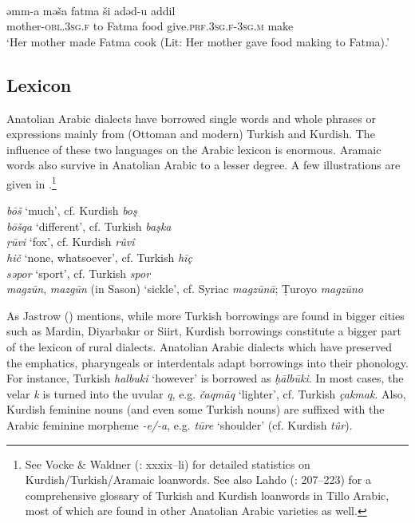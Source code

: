 \documentclass[output=paper]{langsci/langscibook}
\begin{document}
\begin{exe}
\ex \label{persa}
\\
\gll  	əmm-a mə\v{s}a fatma \v{s}i adəd-u    	addil	\\
  mother-\textsc{obl.3sg.f} to Fatma food      give.\textsc{prf.3sg.f-3sg.m}	make	 \\
        \glt `Her mother made Fatma cook (Lit: Her mother gave food making to Fatma).' 
\end{exe}



\subsection{Lexicon}
Anatolian Arabic dialects have borrowed single words and whole phrases or expressions mainly from (Ottoman and modern) Turkish and Kurdish. The influence of these two languages on the Arabic lexicon is enormous. Aramaic words also survive in Anatolian Arabic to a lesser degree. A few illustrations are given in .\footnote{See Vocke \& Waldner (\citeyear{VockeWaldner1982}: xxxix--li) for detailed statistics on Kurdish/Turkish/Aramaic loanwords. See also Lahdo (\citeyear{Lahdo2009}: 207--223) for a comprehensive glossary of Turkish and Kurdish loanwords in Tillo Arabic, most of which are found in other Anatolian Arabic varieties as well.} 

\ea \label{lex}
\noindent \textit{b\={o}\v{s}} `much', cf. Kurdish \textit{bo\c{s}}\\
\textit{b\={o}\v{s}qa} `different', cf. Turkish \textit{ba\c{s}ka}\\
\textit{\d{r}\={u}vi} `fox', cf. Kurdish \textit{rûvî}\\
\textit{hi\v{c}} `none, whatsoever', cf. Turkish \textit{hī\c{c}}\\
\textit{səpor} `sport', cf. Turkish \textit{spor}\\
\textit{magz\={u}n}, \textit{mazg\={u}n} (in Sason) `sickle', cf. Syriac \textit{magz\={u}n\={a}}; \d{T}uroyo \textit{magz\={u}no}\\
\z

\noindent As Jastrow (\citeyear[95]{Jastrow2011anatolian}) mentions, while more Turkish borrowings are found in bigger cities such as Mardin, Diyarbak{\i}r or Siirt, Kurdish borrowings constitute a bigger part of the lexicon of rural dialects. Anatolian Arabic dialects which have preserved the emphatics, pharyngeals or interdentals adapt borrowings into their phonology. For instance, Turkish \textit{halbuki} `however' is borrowed as \textit{\d{h}\={a}lb\={u}ki}. In most cases, the velar \textit{k} is turned into the uvular \textit{q}, e.g. \textit{\v{c}aqm\={a}q} `lighter', cf. Turkish \textit{\c{c}akmak}. Also, Kurdish feminine nouns (and even some Turkish nouns) are suffixed with the Arabic feminine morpheme \textit{-e/-a}, e.g. \textit{t\={u}re} `shoulder' (cf. Kurdish \textit{t\^{u}r}). 
\end{document}
